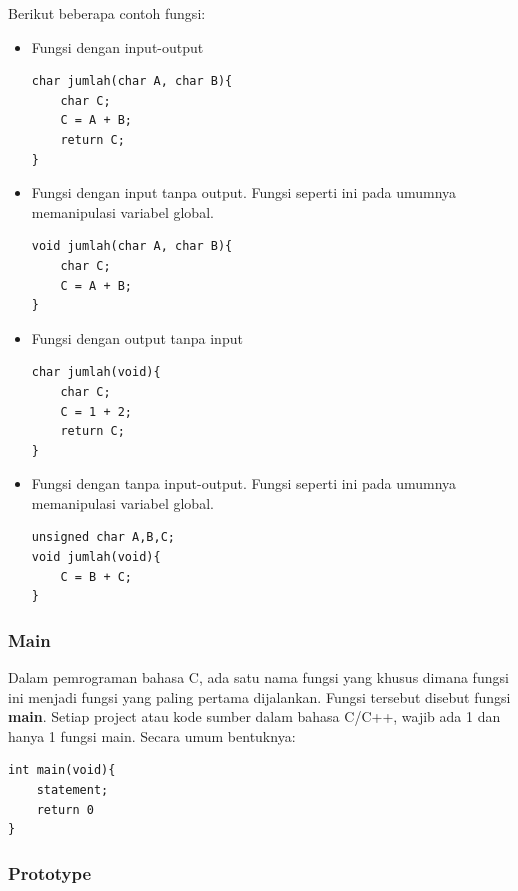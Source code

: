 \documentclass[12pt,]{article}
\begin{document}
	Berikut beberapa contoh fungsi:
	\begin{itemize}
		\item Fungsi dengan input-output
		\begin{verbatim}
char jumlah(char A, char B){
	char C;
	C = A + B;
	return C;
}
		\end{verbatim}

		\item Fungsi dengan input tanpa output.
		Fungsi seperti ini pada umumnya memanipulasi variabel global.
		\begin{verbatim}
void jumlah(char A, char B){
	char C;
	C = A + B;
}
		\end{verbatim}

		\item Fungsi dengan output tanpa input
		\begin{verbatim}
char jumlah(void){
	char C;
	C = 1 + 2;
	return C;
}
		\end{verbatim}

		\item Fungsi dengan tanpa input-output.
		Fungsi seperti ini pada umumnya memanipulasi variabel global.
		\begin{verbatim}
unsigned char A,B,C;
void jumlah(void){
	C = B + C;
}
		\end{verbatim}

	\end{itemize}

	\subsubsection{Main}

	Dalam pemrograman bahasa C, ada satu nama fungsi yang khusus dimana fungsi ini menjadi fungsi yang paling pertama dijalankan.
	Fungsi tersebut disebut fungsi \textbf{main}.
	Setiap project atau kode sumber dalam bahasa C/C++, wajib ada 1 dan hanya 1 fungsi main.
	Secara umum bentuknya:

	\begin{verbatim}
int main(void){
	statement;
	return 0
}
	\end{verbatim}

	\subsubsection{Prototype}
\end{document}
